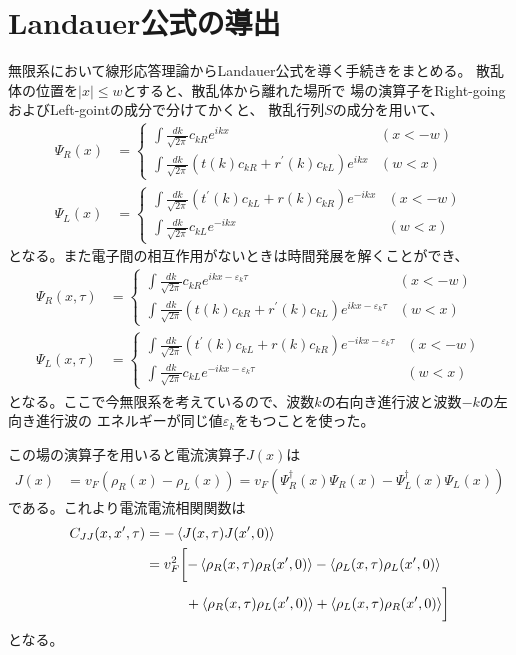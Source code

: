 \documentclass[10pt,a4j]{jarticle}
\begin{document}
\section{Landauer公式の導出}

無限系において線形応答理論からLandauer公式を導く手続きをまとめる。
散乱体の位置を$|x| \le w$とすると、散乱体から離れた場所で
場の演算子をRight-goingおよびLeft-gointの成分で分けてかくと、
散乱行列$S$の成分を用いて、
\begin{align}
\Psi_{R}(x) &= \left\{ \begin{array}{ll} {\displaystyle \int \frac{dk}{\sqrt{2\pi}} c_{kR} e^{ikx}} & (x<-w) \\
{\displaystyle \int \frac{dk}{\sqrt{2\pi}} (t(k)c_{kR} + r^\prime(k) c_{kL}) e^{ikx}} & (w < x) \end{array} \right.\\
\Psi_{L}(x) &=
 \left\{ \begin{array}{ll} {\displaystyle  \int \frac{dk}{\sqrt{2\pi}}(t^\prime(k) c_{kL} + r(k) c_{kR}) e^{-ikx}} & (x<-w) \\
{\displaystyle  \int \frac{dk}{\sqrt{2\pi}} c_{kL}e^{-ikx} } & (w < x) \end{array} \right.
\end{align}
となる。また電子間の相互作用がないときは時間発展を解くことができ、
\begin{align}
\Psi_{R}(x,\tau) &= \left\{ \begin{array}{ll} {\displaystyle \int \frac{dk}{\sqrt{2\pi}} c_{kR}e^{ikx-\varepsilon_k \tau}}& (x<-w) \\
{\displaystyle  \int \frac{dk}{\sqrt{2\pi}}(t(k)c_{kR} + r^\prime(k) c_{kL}) e^{ikx-\varepsilon_k \tau}} & (w < x) \end{array} \right.\\
\Psi_{L}(x,\tau) &=
 \left\{ \begin{array}{ll} {\displaystyle \int \frac{dk}{\sqrt{2\pi}}(t^\prime(k) c_{kL} + r(k) c_{kR}) e^{-ikx-\varepsilon_k \tau}} & (x<-w) \\
{\displaystyle  \int \frac{dk}{\sqrt{2\pi}} c_{kL} e^{-ikx-\varepsilon_k \tau}} & (w < x) \end{array} \right.
\end{align}
となる。ここで今無限系を考えているので、波数$k$の右向き進行波と波数$-k$の左向き進行波の
エネルギーが同じ値$\varepsilon_k$をもつことを使った。

この場の演算子を用いると電流演算子$J(x)$は
\begin{align}
J(x) &= v_F(\rho_R(x) -  \rho_L(x)) =v_F( \Psi^{\dagger}_R(x) \Psi_R(x) -  \Psi^\dagger_L(x) \Psi_L(x))
\end{align}
である。これより電流電流相関関数は
\begin{align}
C_{JJ}(x,x^\prime,\tau) &=- \braket{J(x,\tau) J(x^\prime,0)}\\
&=v_F^2 \biggl[ -\braket{\rho_R(x,\tau) \rho_R(x^\prime,0)} -\braket{\rho_L(x,\tau) \rho_L(x^\prime,0)} \nonumber \\
& \hspace{10mm} + \braket{\rho_R(x,\tau) \rho_L(x^\prime,0)} + \braket{\rho_L(x,\tau) \rho_R(x^\prime,0)} \biggr]
\end{align}
となる。
\end{document}
